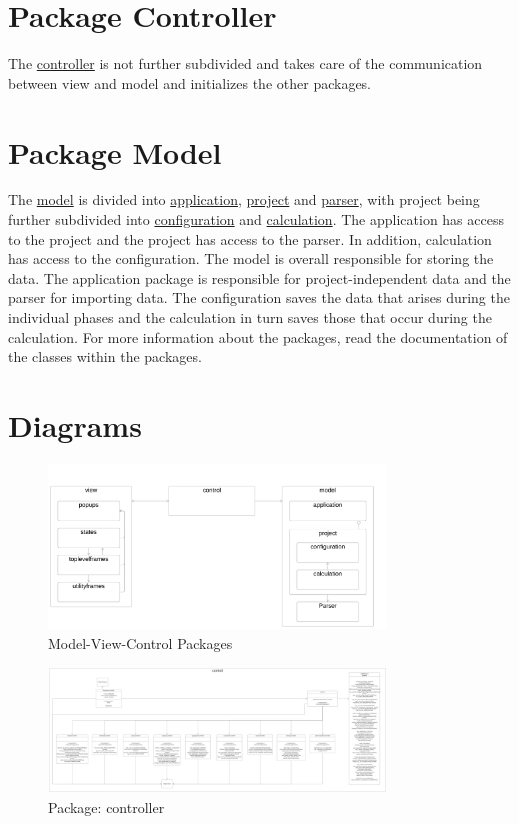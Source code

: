 \documentclass[parskip=full]{report} %
\begin{document}
\section{Package Controller}
The \hyperref[fig:controller]{controller} is not further subdivided and takes care of the communication between view and model and initializes the other packages.

\section{Package Model}
The \hyperref[fig:model]{model} is divided into \hyperref[fig:application]{application}, \hyperref[fig:project]{project} and \hyperref[fig:parser]{parser}, with project being further subdivided into \hyperref[fig:configuration]{configuration} and \hyperref[fig:calculation]{calculation}. The application has access to the project and the project has access to the parser. In addition, calculation has access to the configuration. The model is overall responsible for storing the data. The application package is responsible for project-independent data and the parser for importing data. The configuration saves the data that arises during the individual phases and the calculation in turn saves those that occur during the calculation. For more information about the packages, read the documentation of the classes within the packages.

\section{Diagrams}

\hypertarget{mvc}{
\begin{figure}[hbt!]
  \centering
\includegraphics[width=0.8\textwidth]
        {pictures/mvc.png}
  \caption{Model-View-Control Packages}
  \label{fig:mvc}
\end{figure}
}

\hypertarget{controller}{
\begin{figure}[hbt!]
  \centering
\includegraphics[width=0.8\textwidth]
        {pictures/controller.png}
  \caption{Package: controller}
  \label{fig:controller}
\end{figure}
}
\end{document}

